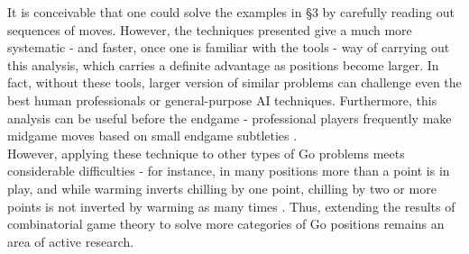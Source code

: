 \documentclass[../math194_paper.tex]{subfiles}
\begin{document}
It is conceivable that one could solve the examples in \S 3 by carefully reading out 
sequences of moves. However, the techniques presented give a much more systematic - 
and faster, once one is familiar with the tools - way of carrying out this analysis,
which carries a definite advantage as positions become larger.
In fact, without these tools, larger version of similar problems can challenge 
even the best human professionals or general-purpose AI techniques.
Furthermore, this analysis can be useful before the endgame - 
professional players frequently make midgame moves based on small endgame subtleties 
\cite[\S 5.1]{berlekamp1994mathematical}. \\

However, applying these technique to other types of Go problems meets considerable
difficulties - for instance, in many positions more than a point is in play, 
and while warming inverts chilling by one point, chilling by two or more points is not 
inverted by warming as many times \cite[\S 5.2]{berlekamp1994mathematical}.
Thus, extending the results of combinatorial game theory to solve more categories of Go positions 
remains an area of active research. 
\end{document}
